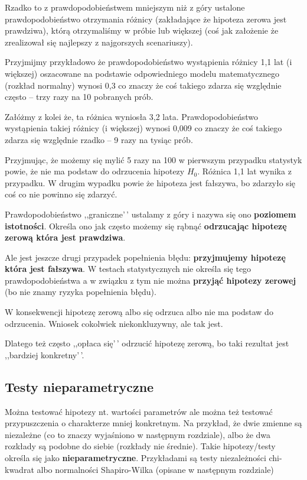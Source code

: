\documentclass[
  openany]{book}
\begin{document}
Rzadko to z prawdopodobieństwem mniejszym niż z góry ustalone prawdopodobieństwo
otrzymania różnicy (zakładające że hipoteza zerowa jest prawdziwa),
którą otrzymaliśmy w próbie lub większej
(coś jak założenie że zrealizował się najlepszy z najgorszych scenariuszy).

Przyjmijmy przykładowo że prawdopodobieństwo wystąpienia różnicy 1,1 lat (i większej) oszacowane
na podstawie odpowiedniego modelu matematycznego (rozkład normalny) wynosi 0,3
co znaczy że coś takiego
zdarza się względnie często -- trzy razy na 10 pobranych prób.

Załóżmy z kolei że, ta różnica wyniosła 3,2 lata. Prawdopodobieństwo
wystąpienia takiej różnicy (i większej) wynosi 0,009 co znaczy że coś takiego
zdarza się względnie rzadko -- 9 razy na tysiąc prób.

Przyjmując, że możemy się mylić 5 razy na 100 w pierwszym przypadku statystyk powie,
że nie ma podstaw do odrzucenia hipotezy \(H_0\).
Różnica 1,1 lat wynika z przypadku. W drugim wypadku
powie że hipoteza jest fałszywa, bo zdarzyło się coś co nie powinno się zdarzyć.

Prawdopodobieństwo ,,graniczne'\,' ustalamy z góry i
nazywa się ono \textbf{poziomem istotności}. Określa ono jak często
możemy się rąbnąć \textbf{odrzucając hipotezę zerową która jest prawdziwa}.

Ale jest jeszcze drugi przypadek popełnienia błędu:
\textbf{przyjmujemy hipotezę która jest fałszywa}. W testach
statystycznych nie określa się tego prawdopodobieństwa a w związku z tym nie można
\textbf{przyjąć hipotezy zerowej} (bo nie znamy ryzyka popełnienia błędu).

W konsekwencji hipotezę zerową albo się odrzuca albo nie ma podstaw do odrzucenia.
Wniosek cokolwiek niekonkluzywny, ale tak jest.

Dlatego też często ,,opłaca się'\,' odrzucić hipotezę zerową, bo taki rezultat jest
,,bardziej konkretny'\,'.

\hypertarget{testy-nieparametryczne}{%
\subsection{Testy nieparametryczne}\label{testy-nieparametryczne}}

Można testować hipotezy nt. wartości parametrów ale można też testować
przypuszczenia o charakterze mniej konkretnym. Na przykład, że dwie zmienne
są niezależne (co to znaczy wyjaśniono w następnym rozdziale), albo
że dwa rozkłady są podobne do siebie (rozkłady nie średnie).
Takie hipotezy/testy określa się jako \textbf{nieparametryczne}.
Przykładami są testy niezależności chi-kwadrat albo normalności
Shapiro-Wilka (opisane w następnym rozdziale)
\end{document}
